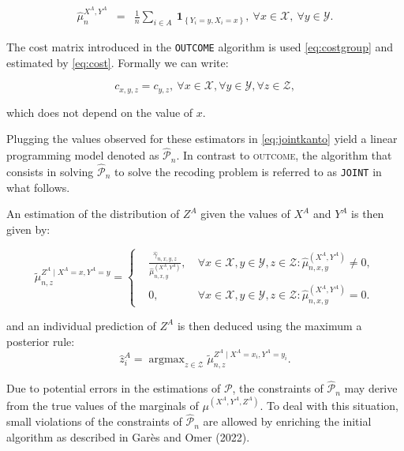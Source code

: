\begin{equation}
     \begin{aligned}
         \hat{\mu}^{X^A,Y^A}_{n} & = & \frac{1}{n}\sum_{i\in A} ~\mathbf{1}_{\left\{Y_i = y,X_i = x\right\}}, \:\forall x\in\mathcal{X}, \: \forall y\in\mathcal{Y}.
     \end{aligned}
     \label{eq:estimatoutcov}
 \end{equation}

The cost matrix introduced in the \texttt{OUTCOME} algorithm is used \eqref{eq:costgroup} and estimated by \eqref{eq:cost}. Formally we can write:

\begin{equation} 
  c_{x,y,z} = c_{y,z}, \:\forall x\in\mathcal{X},\forall y\in\mathcal{Y},\forall z\in\mathcal{Z},
  \label{eq:truecostjoint}
\end{equation}

\noindent which does not depend on the value of \(x\).

Plugging the values observed for these estimators in \eqref{eq:jointkanto} yield a linear programming model denoted as \(\widehat{\mathcal{P}}_n\). In contrast to \textsc{outcome}, the algorithm that consists in solving \(\widehat{\mathcal{P}}_n\) to solve the recoding problem is referred to as \texttt{JOINT} in what follows.

An estimation of the distribution of \(Z^A\) given the values of \(X^A\) and \(Y^A\) is then given by:

\begin{equation}
 \tilde{\mu}^{Z^A\mid X^A=x,Y^A=y}_{n,z}=
 \left\{\begin{aligned}
 &\frac{\hat{\gamma}_{n,x,y,z}}{\hat{\mu}^{(X^A,Y^A)}_{n,x,y}}, & \:\forall x\in\mathcal{X},y\in\mathcal{Y},z\in\mathcal{Z}: \hat{\mu}^{(X^A,Y^A)}_{n,x,y}\neq 0,\\
 &0, & \:\forall x\in\mathcal{X},y\in\mathcal{Y},z\in\mathcal{Z}: \hat{\mu}^{(X^A,Y^A)}_{n,x,y}= 0.
 \end{aligned}\right.
\label{eq:condprob}
\end{equation}

and an individual prediction of \(Z^A\) is then deduced using the maximum a posterior rule:
\[
\widehat{z}_i^A= \operatorname{argmax}_{z\in\mathcal{Z}} \tilde{\mu}^{Z^A\mid X^A=x_i,Y^A=y_i}_{n,z}.
\]

Due to potential errors in the estimations of \(\mathcal{P}\), the constraints of \(\widehat{\mathcal{P}}_n\) may derive from the true values of the marginals of \(\mu^{(X^A,Y^A,Z^A)}\). To deal with this situation, small violations of the constraints of \(\widehat{\mathcal{P}}_n\) are allowed by enriching the initial algorithm as described in Garès and Omer (2022).

